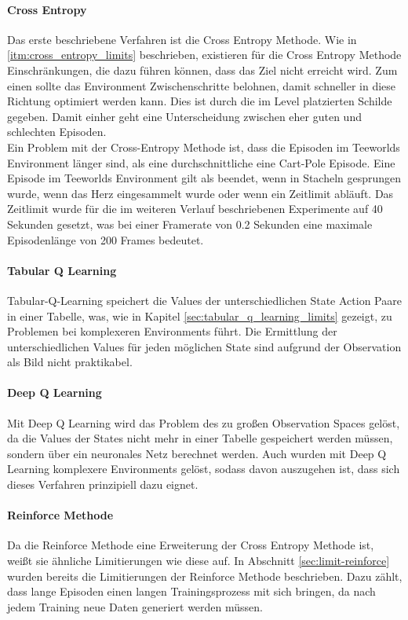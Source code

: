 \documentclass[11pt]{scrartcl}
\begin{document}
\paragraph{Cross Entropy}
Das erste beschriebene Verfahren ist die Cross Entropy Methode. Wie in
\ref{itm:cross_entropy_limits} beschrieben, existieren für die Cross Entropy Methode
Einschränkungen, die dazu führen können, dass das Ziel nicht erreicht wird. Zum einen
sollte das Environment Zwischenschritte belohnen, damit schneller in diese Richtung
optimiert werden kann. Dies ist durch die im Level platzierten Schilde gegeben. Damit
einher geht eine Unterscheidung zwischen eher guten und schlechten Episoden.\\
Ein Problem mit der Cross-Entropy Methode ist, dass die Episoden im Teeworlds Environment
länger sind, als eine durchschnittliche eine Cart-Pole Episode. Eine Episode im Teeworlds
Environment gilt als beendet, wenn in Stacheln gesprungen wurde, wenn das Herz
eingesammelt wurde oder wenn ein Zeitlimit abläuft. Das Zeitlimit wurde für die im
weiteren Verlauf beschriebenen Experimente auf 40 Sekunden gesetzt, was bei einer
Framerate von 0.2 Sekunden eine maximale Episodenlänge von 200 Frames bedeutet.

\paragraph{Tabular Q Learning}
Tabular-Q-Learning speichert die Values der unterschiedlichen State Action Paare in einer
Tabelle, was, wie in Kapitel \ref{sec:tabular_q_learning_limits} gezeigt, zu Problemen bei
komplexeren Environments führt. Die Ermittlung der unterschiedlichen Values für jeden
möglichen State sind aufgrund der Observation als Bild nicht praktikabel.

\paragraph{Deep Q Learning}
Mit Deep Q Learning wird das Problem des zu großen Observation Spaces gelöst, da die
Values der States nicht mehr in einer Tabelle gespeichert werden müssen, sondern über ein
neuronales Netz berechnet werden. Auch wurden mit Deep Q Learning komplexere Environments
gelöst, sodass davon auszugehen ist, dass sich dieses Verfahren prinzipiell dazu eignet.

\paragraph{Reinforce Methode}
Da die Reinforce Methode eine Erweiterung der Cross Entropy Methode ist, weißt sie
ähnliche Limitierungen wie diese auf. In Abschnitt \ref{sec:limit-reinforce} wurden
bereits die Limitierungen der Reinforce Methode beschrieben. Dazu zählt, dass lange
Episoden einen langen Trainingsprozess mit sich bringen, da nach jedem Training neue Daten
generiert werden müssen.
\end{document}

